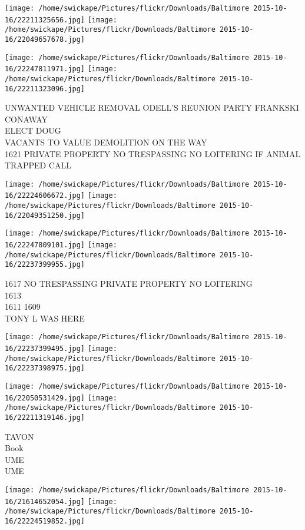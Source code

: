 \documentclass[10pt,letterpaper]{article}
\begin{document}
\texttt{[image: /home/swickape/Pictures/flickr/Downloads/Baltimore 2015-10-16/22211325656.jpg]}
\texttt{[image: /home/swickape/Pictures/flickr/Downloads/Baltimore 2015-10-16/22049657678.jpg]}

\texttt{[image: /home/swickape/Pictures/flickr/Downloads/Baltimore 2015-10-16/22247811971.jpg]}
\texttt{[image: /home/swickape/Pictures/flickr/Downloads/Baltimore 2015-10-16/22211323096.jpg]}

UNWANTED VEHICLE REMOVAL ODELL'S REUNION PARTY FRANKSKI CONAWAY\\
ELECT DOUG\\
VACANTS TO VALUE DEMOLITION ON THE WAY\\
1621 PRIVATE PROPERTY NO TRESPASSING NO LOITERING IF ANIMAL TRAPPED CALL\\
\pagebreak

\texttt{[image: /home/swickape/Pictures/flickr/Downloads/Baltimore 2015-10-16/22224606672.jpg]}
\texttt{[image: /home/swickape/Pictures/flickr/Downloads/Baltimore 2015-10-16/22049351250.jpg]}

\texttt{[image: /home/swickape/Pictures/flickr/Downloads/Baltimore 2015-10-16/22247809101.jpg]}
\texttt{[image: /home/swickape/Pictures/flickr/Downloads/Baltimore 2015-10-16/22237399955.jpg]}

1617 NO TRESPASSING PRIVATE PROPERTY NO LOITERING\\
1613\\
1611 1609\\
TONY L WAS HERE\\
\pagebreak

\texttt{[image: /home/swickape/Pictures/flickr/Downloads/Baltimore 2015-10-16/22237399495.jpg]}
\texttt{[image: /home/swickape/Pictures/flickr/Downloads/Baltimore 2015-10-16/22237398975.jpg]}

\texttt{[image: /home/swickape/Pictures/flickr/Downloads/Baltimore 2015-10-16/22050531429.jpg]}
\texttt{[image: /home/swickape/Pictures/flickr/Downloads/Baltimore 2015-10-16/22211319146.jpg]}

TAVON\\
Book\\
UME\\
UME\\
\pagebreak

\texttt{[image: /home/swickape/Pictures/flickr/Downloads/Baltimore 2015-10-16/21614652054.jpg]}
\texttt{[image: /home/swickape/Pictures/flickr/Downloads/Baltimore 2015-10-16/22224519852.jpg]}
\end{document}
